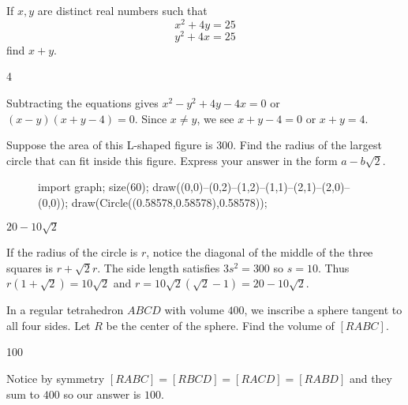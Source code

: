 \documentclass[11pt]{article}
\begin{document}
\begin{problem}
If $x,y$ are distinct real numbers such that \[ x^2 + 4y = 25 \] \[y^2 + 4x = 25\] find $x+y$.
\end{problem}
\begin{answer}
4
\end{answer}
\begin{solution}
Subtracting the equations gives $x^2 - y^2 + 4y - 4x = 0$ or $(x-y)(x+y-4) = 0$. Since $x \ne y$, we see $x+y -4 = 0$ or $x+y = 4$. 
\end{solution}


\begin{problem}
Suppose the area of this L-shaped figure is $300$. Find the radius of the largest circle that can fit inside this figure. Express your answer in the form $a - b\sqrt{2}$.
\begin{figure}[H]
	\begin{center}
		\begin{asy}
		import graph;
		size(60);
		draw((0,0)--(0,2)--(1,2)--(1,1)--(2,1)--(2,0)--(0,0));
		draw(Circle((0.58578,0.58578),0.58578));
\end{asy}
	\end{center}
\end{figure}  
\end{problem}

\begin{answer}
$20-10\sqrt2$
\end{answer}
\begin{solution}
If the radius of the circle is $r$, notice the diagonal of the middle of the three squares is $r + \sqrt2 r$. The side length satisfies $3s^2 = 300$ so $s = 10$. Thus $r(1 + \sqrt2) = 10\sqrt2$ and $r = 10\sqrt2 (\sqrt2 - 1) = 20 - 10\sqrt{2}$. 
\end{solution}

\begin{problem}
In a regular tetrahedron $ABCD$ with volume $400$, we inscribe a sphere tangent to all four sides. Let $R$ be the center of the sphere. Find the volume of $[RABC]$.
\end{problem}
\begin{answer}
100
\end{answer}
\begin{solution}
Notice by symmetry $[RABC] = [RBCD] = [RACD] = [RABD]$ and they sum to $400$ so our answer is $100$.
\end{solution}
\end{document}

